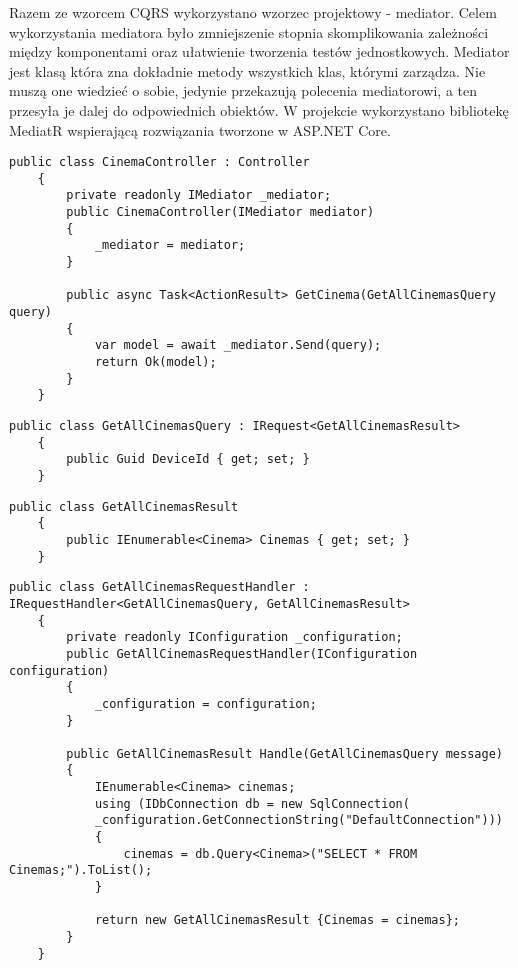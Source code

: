 Razem ze wzorcem CQRS wykorzystano wzorzec projektowy - mediator. Celem wykorzystania mediatora było zmniejszenie stopnia skomplikowania zależności między komponentami oraz ułatwienie tworzenia testów jednostkowych. Mediator jest klasą która zna dokładnie metody wszystkich klas, którymi zarządza. Nie muszą one wiedzieć o sobie, jedynie przekazują polecenia mediatorowi, a ten przesyła je dalej do odpowiednich obiektów. W projekcie wykorzystano bibliotekę MediatR wspierającą rozwiązania tworzone w ASP.NET Core.
\newpage
\begin{lstlisting}[caption={Przykładowa metoda kontrolera w aplikacji wykorzystującej CQRS oraz wzorzec mediatora},captionpos=b]
 public class CinemaController : Controller
    {
        private readonly IMediator _mediator;
        public CinemaController(IMediator mediator)
        {
            _mediator = mediator;
        }

        public async Task<ActionResult> GetCinema(GetAllCinemasQuery query)
        {
            var model = await _mediator.Send(query);
            return Ok(model);
        }
    }
\end{lstlisting}
\begin{lstlisting}[caption={Przykładowy model polecenia odczytu danych},captionpos=b]
 public class GetAllCinemasQuery : IRequest<GetAllCinemasResult>
    {
        public Guid DeviceId { get; set; }
    }
\end{lstlisting}
\begin{lstlisting}[caption={Przykładowy model odpowiedzi serwera},captionpos=b]
 public class GetAllCinemasResult
    {
        public IEnumerable<Cinema> Cinemas { get; set; }
    }
\end{lstlisting}
\newpage
\begin{lstlisting}[caption={Przykładowa realizacja operacji odczytu danych},captionpos=b]
 public class GetAllCinemasRequestHandler : IRequestHandler<GetAllCinemasQuery, GetAllCinemasResult>
    {
        private readonly IConfiguration _configuration;
        public GetAllCinemasRequestHandler(IConfiguration configuration)
        {
            _configuration = configuration;
        }

        public GetAllCinemasResult Handle(GetAllCinemasQuery message)
        {
            IEnumerable<Cinema> cinemas;
            using (IDbConnection db = new SqlConnection(
            _configuration.GetConnectionString("DefaultConnection")))
            {
                cinemas = db.Query<Cinema>("SELECT * FROM Cinemas;").ToList();
            }

            return new GetAllCinemasResult {Cinemas = cinemas};
        }
    }
\end{lstlisting}
\newpage
